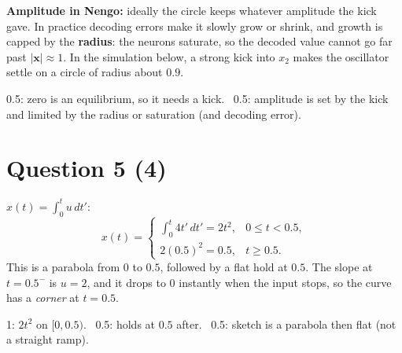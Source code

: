 \documentclass[11pt,letterpaper]{article}
\newcommand{\ans}[1]{\par\vspace{4pt}{\bfseries #1}\quad}
\begin{document}
\textbf{Amplitude in Nengo:} ideally the circle keeps whatever amplitude the kick gave. In practice decoding errors make it slowly grow or shrink, and growth is capped by the \textbf{radius}: the neurons saturate, so the decoded value cannot go far past $|\mathbf x| \approx 1$. In the simulation below, a strong kick into $x_2$ makes the oscillator settle on a circle of radius about $0.9$.
\begin{center}
\end{center}
\begin{marking}
0.5: zero is an equilibrium, so it needs a kick. \ 0.5: amplitude is set by the kick and limited by the radius or saturation (and decoding error).
\end{marking}

\section*{Question 5 \hfill (4)}

\ans{(a) [2]}
$x(t) = \int_0^t u\,dt'$:
\[
x(t) = \begin{cases} \int_0^t 4t'\,dt' = 2t^2, & 0 \le t < 0.5,\\ 2(0.5)^2 = 0.5, & t \ge 0.5.\end{cases}
\]
This is a parabola from $0$ to $0.5$, followed by a flat hold at $0.5$. The slope at $t = 0.5^-$ is $u = 2$, and it drops to $0$ instantly when the input stops, so the curve has a \emph{corner} at $t = 0.5$.
\begin{marking}
1: $2t^2$ on $[0, 0.5)$. \ 0.5: holds at $0.5$ after. \ 0.5: sketch is a parabola then flat (not a straight ramp).
\end{marking}
\end{document}
